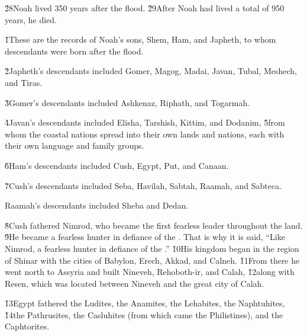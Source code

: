 \v{28}Noah lived 350 years after the flood. \v{29}After Noah had lived a total of 950 years, he died.

\v{1}These are the records of Noah's sons, Shem, Ham, and Japheth, to whom descendants were born after the flood.

\v{2}Japheth's descendants included Gomer, Magog, Madai, Javan, Tubal, Meshech, and Tiras.

\v{3}Gomer's descendants included Ashkenaz, Riphath, and Togarmah.

\v{4}Javan's descendants included Elisha, Tarshish, Kittim, and Dodanim, \v{5}from whom the coastal nations spread into their own lands and nations, each with their own language and family groups.

\v{6}Ham's descendants included Cush, Egypt, Put, and Canaan.

\v{7}Cush's descendants included Seba, Havilah, Sabtah, Raamah, and Sabteca.

Raamah's descendants included Sheba and Dedan.

\v{8}Cush fathered Nimrod, who became the first fearless leader throughout the land. \v{9}He became a fearless hunter in defiance of the . That is why it is said, ``Like Nimrod, a fearless hunter in defiance of the .'' \v{10}His kingdom began in the region of Shinar with the cities of Babylon, Erech, Akkad, and Calneh. \v{11}From there he went north to Assyria and built Nineveh, Rehoboth-ir, and Calah, \v{12}along with Resen, which was located between Nineveh and the great city of Calah.

\v{13}Egypt fathered the Ludites, the Anamites, the Lehabites, the Naphtuhites, \v{14}the Pathrusites, the Casluhites (from which came the Philistines), and the Caphtorites.

